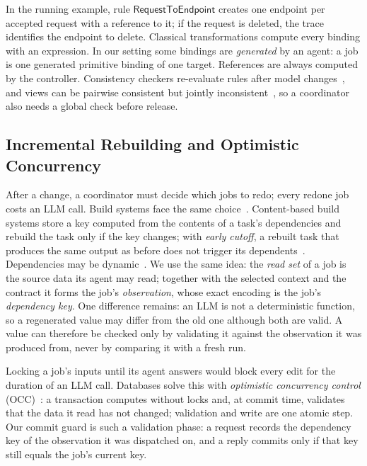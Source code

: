 In the running example, rule $\mathsf{RequestToEndpoint}$ creates one endpoint per accepted request with a reference to it; if the request is deleted, the trace identifies the endpoint to delete. Classical transformations compute every binding with an expression. In our setting some bindings are \emph{generated} by an agent: a job is one generated primitive binding of one target. References are always computed by the controller. Consistency checkers re-evaluate rules after model changes~\cite{egyed2006instant,egyed2011tracking}, and views can be pairwise consistent but jointly inconsistent~\cite{stevens,klare}, so a coordinator also needs a global check before release.

\subsection{Incremental Rebuilding and Optimistic Concurrency}\label{sec:bg-incremental}
After a change, a coordinator must decide which jobs to redo; every redone job costs an LLM call. Build systems face the same choice~\cite{mokhov}. Content-based build systems store a key computed from the contents of a task's dependencies and rebuild the task only if the key changes; with \emph{early cutoff}, a rebuilt task that produces the same output as before does not trigger its dependents~\cite{mokhov,mitchell2012shake}. Dependencies may be dynamic~\cite{erdweg2015pluto}. We use the same idea: the \emph{read set} of a job is the source data its agent may read; together with the selected context and the contract it forms the job's \emph{observation}, whose exact encoding is the job's \emph{dependency key}. One difference remains: an LLM is not a deterministic function, so a regenerated value may differ from the old one although both are valid. A value can therefore be checked only by validating it against the observation it was produced from, never by comparing it with a fresh run.

Locking a job's inputs until its agent answers would block every edit for the duration of an LLM call. Databases solve this with \emph{optimistic concurrency control} (OCC)~\cite{occ}: a transaction computes without locks and, at commit time, validates that the data it read has not changed; validation and write are one atomic step. Our commit guard is such a validation phase: a request records the dependency key of the observation it was dispatched on, and a reply commits only if that key still equals the job's current key.

